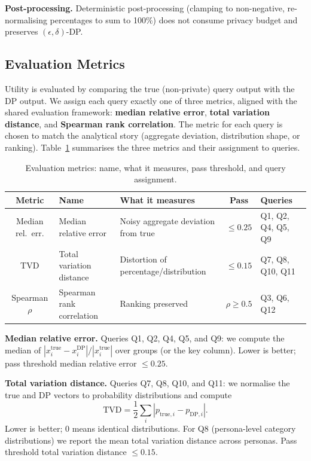 \documentclass[12pt,letterpaper]{article}
\begin{document}
\textbf{Post-processing.} Deterministic post-processing (clamping to non-negative, re-normalising percentages to sum to 100\%) does not consume privacy budget and preserves $(\epsilon,\delta)$-DP.

\subsection{Evaluation Metrics}
\label{sec:eval_metrics_methods}

Utility is evaluated by comparing the true (non-private) query output with the DP output. We assign each query exactly one of three metrics, aligned with the shared evaluation framework: \textbf{median relative error}, \textbf{total variation distance}, and \textbf{Spearman rank correlation}. The metric for each query is chosen to match the analytical story (aggregate deviation, distribution shape, or ranking). Table~\ref{tab:metrics_summary} summarises the three metrics and their assignment to queries.

\begin{table}[htbp]
\centering
\caption{Evaluation metrics: name, what it measures, pass threshold, and query assignment.}
\label{tab:metrics_summary}
\begin{tabular}{@{}clp{3.6cm}cp{2.4cm}@{}}
\toprule
\textbf{Metric} & \textbf{Name} & \textbf{What it measures} & \textbf{Pass} & \textbf{Queries} \\
\midrule
Median rel.\ err. & Median relative error & Noisy aggregate deviation from true & $\leq 0.25$ & Q1, Q2, Q4, Q5, Q9 \\
TVD & Total variation distance & Distortion of percentage/distribution & $\leq 0.15$ & Q7, Q8, Q10, Q11 \\
Spearman $\rho$ & Spearman rank correlation & Ranking preserved & $\rho \geq 0.5$ & Q3, Q6, Q12 \\
\bottomrule
\end{tabular}
\end{table}

\textbf{Median relative error.} Queries Q1, Q2, Q4, Q5, and Q9: we compute the median of $|x_i^{\text{true}} - x_i^{\text{DP}}| / |x_i^{\text{true}}|$ over groups (or the key column). Lower is better; pass threshold median relative error $\leq 0.25$.

\textbf{Total variation distance.} Queries Q7, Q8, Q10, and Q11: we normalise the true and DP vectors to probability distributions and compute
\[
\text{TVD} = \frac{1}{2} \sum_i |p_{\text{true},i} - p_{\text{DP},i}|.
\]
Lower is better; 0 means identical distributions. For Q8 (persona-level category distributions) we report the mean total variation distance across personas. Pass threshold total variation distance $\leq 0.15$.
\end{document}
